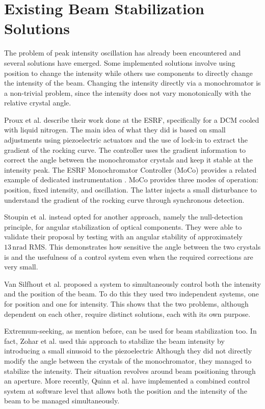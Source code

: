 \section{Existing Beam Stabilization Solutions}

The problem of peak intensity oscillation has already been encountered and several solutions have emerged.
Some implemented solutions involve using position to change the intensity while others use components to directly change the intensity of the beam.
Changing the intensity directly via a monochromator is a non-trivial problem, since the intensity does not vary monotonically with the relative crystal angle.

Proux et al. \cite{Proux2006} describe their work done at the ESRF, specifically for a DCM cooled with liquid nitrogen.
The main idea of what they did is based on small adjustments using piezoelectric actuators and the use of lock-in to extract the gradient of the rocking curve.
The controller uses the gradient information to correct the angle between the monochromator crystals and keep it stable at the intensity peak.
The ESRF Monochromator Controller (MoCo) provides a related example of dedicated instrumentation \cite{MoCo2008}. 
MoCo provides three modes of operation: position, fixed intensity, and oscillation.
The latter injects a small disturbance to understand the gradient of the rocking curve through synchronous detection.

Stoupin et al. \cite{Stoupin2010} instead opted for another approach, namely the null-detection principle, for angular stabilization of optical components.
They were able to validate their proposal by testing with an angular stability of approximately $13\,\mathrm{nrad}$ RMS.
This demonstrates how sensitive the angle between the two crystals is and the usefulness of a control system even when the required corrections are very small.

Van Silfhout et al. \cite{vanSilfhout2014} proposed a system to simultaneously control both the intensity and the position of the beam.
To do this they used two independent systems, one for position and one for intensity.
This shows that the two problems, although dependent on each other, require distinct solutions, each with its own purpose.

Extremum-seeking, as mention before, can be used for beam stabilization too. 
In fact, Zohar et al. \cite{Zohar2016} used this approach to stabilize the beam intensity by introducing a small sinusoid to the piezoelectric
Although they did not directly modify the angle between the crystals of the monochromator, they managed to stabilize the intensity.
Their situation revolves around beam positioning through an aperture.
More recently, Quinn et al. \cite{Quinn2021} have implemented a combined control system at software level that allows both the position and the intensity of the beam to be managed simultaneously.


